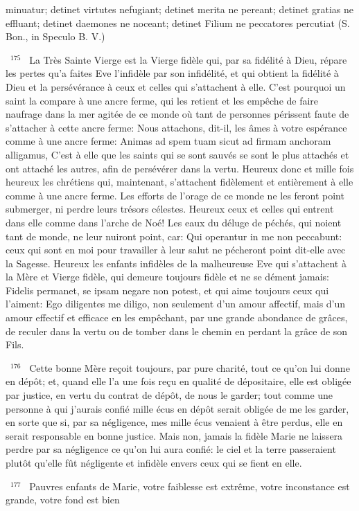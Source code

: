 \documentclass[paper=a5,pagesize=pdftex,fontsize=15pt,headinclude=on,twoside=off]{scrbook}
\newcommand{\negphantom}[1]{\settowidth{\dimen0}{#1}\hspace*{-\dimen0}}
\newcommand{\versenb}[1]{\par \vspace{10pt}~\negphantom{~${}^{#1}$~}${}^{#1}$~}
\begin{document}
minuatur; detinet virtutes nefugiant; detinet merita ne pereant; detinet gratias ne effluant; detinet daemones ne
noceant; detinet Filium ne peccatores percutiat (S. Bon., in Speculo B. V.)
\versenb{175} La Très Sainte Vierge est la Vierge fidèle qui, par sa fidélité à Dieu, répare les pertes qu'a faites Eve l'infidèle
par son infidélité, et qui obtient la fidélité à Dieu et la persévérance à ceux et celles qui s'attachent à elle. C'est
pourquoi un saint la compare à une ancre ferme, qui les retient et les empêche de faire naufrage dans la mer
agitée de ce monde où tant de personnes périssent faute de s'attacher à cette ancre ferme: Nous attachons, dit-il,
les âmes à votre espérance comme à une ancre ferme: Animas ad spem tuam sicut ad firmam anchoram
alligamus, C'est à elle que les saints qui se sont sauvés se sont le plus attachés et ont attaché les autres, afin de
persévérer dans la vertu. Heureux donc et mille fois heureux les chrétiens qui, maintenant, s'attachent fidèlement
et entièrement à elle comme à une ancre ferme. Les efforts de l'orage de ce monde ne les feront point submerger,
ni perdre leurs trésors célestes. Heureux ceux et celles qui entrent dans elle comme dans l'arche de Noé! Les
eaux du déluge de péchés, qui noient tant de monde, ne leur nuiront point, car: Qui operantur in me non
peccabunt: ceux qui sont en moi pour travailler à leur salut ne pécheront point dit-elle avec la Sagesse. Heureux
les enfants infidèles de la malheureuse Eve qui s'attachent à la Mère et Vierge fidèle, qui demeure toujours fidèle
et ne se dément jamais: Fidelis permanet, se ipsam negare non potest, et qui aime toujours ceux qui l'aiment: Ego
diligentes me diligo, non seulement d'un amour affectif, mais d'un amour effectif et efficace en les empêchant, par
une grande abondance de grâces, de reculer dans la vertu ou de tomber dans le chemin en perdant la grâce de
son Fils.
\versenb{176} Cette bonne Mère reçoit toujours, par pure charité, tout ce qu'on lui donne en dépôt; et, quand elle l'a une
fois reçu en qualité de dépositaire, elle est obligée par justice, en vertu du contrat de dépôt, de nous le garder; tout
comme une personne à qui j'aurais confié mille écus en dépôt serait obligée de me les garder, en sorte que si, par
sa négligence, mes mille écus venaient à être perdus, elle en serait responsable en bonne justice. Mais non,
jamais la fidèle Marie ne laissera perdre par sa négligence ce qu'on lui aura confié: le ciel et la terre passeraient
plutôt qu'elle fût négligente et infidèle envers ceux qui se fient en elle.
\versenb{177} Pauvres enfants de Marie, votre faiblesse est extrême, votre inconstance est grande, votre fond est bien
\end{document}
